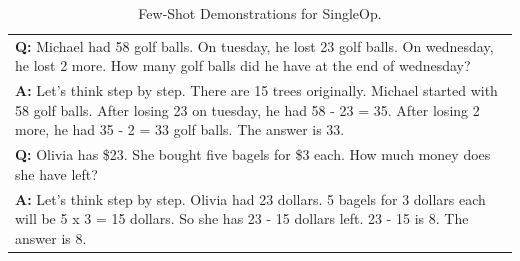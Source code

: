 \documentclass[11pt]{article}
\begin{document}
\begin{table}[ht]
\begin{tabularx}{\textwidth}{X}
    \hdashline
    \textbf{Q: }Michael had 58 golf balls. On tuesday, he lost 23 golf balls. On wednesday, he lost 2 more. How many golf balls did he have at the end of wednesday? \\
    \textbf{A: }Let's think step by step. There are 15 trees originally. Michael started with 58 golf balls. After losing 23 on tuesday, he had 58 - 23 = 35. After losing 2 more, he had 35 - 2 = 33 golf balls. The answer is 33.\\
    \hdashline
    \textbf{Q: }Olivia has \$23. She bought five bagels for \$3 each. How much money does she have left? \\
    \textbf{A: }Let's think step by step. Olivia had 23 dollars. 5 bagels for 3 dollars each will be 5 x 3 = 15 dollars. So she has 23 - 15 dollars left. 23 - 15 is 8. The answer is 8.\\
    \bottomrule
    \end{tabularx}
    \caption{Few-Shot Demonstrations for SingleOp.}
    \label{tab:fs_singleop}
\end{table}
\end{document}
